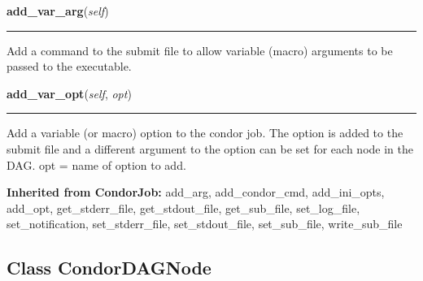    \noindent\begin{boxedminipage}{\textwidth}

    \raggedright \textbf{add\_var\_arg}(\textit{self})

    \vspace{-1.5ex}

    \rule{\textwidth}{0.5\fboxrule}
    Add a command to the submit file to allow variable (macro) arguments 
    to be passed to the executable.

    \vspace{1ex}

    \end{boxedminipage}

    \label{pipeline:CondorDAGJob:add_var_opt}
    \vspace{0.5ex}

    \noindent\begin{boxedminipage}{\textwidth}

    \raggedright \textbf{add\_var\_opt}(\textit{self}, \textit{opt})

    \vspace{-1.5ex}

    \rule{\textwidth}{0.5\fboxrule}
    Add a variable (or macro) option to the condor job. The option is 
    added to the submit file and a different argument to the option can 
    be set for each node in the DAG. opt = name of option to add.

    \vspace{1ex}

    \end{boxedminipage}

  \noindent\textbf{Inherited from CondorJob:}
    add\_arg,
    add\_condor\_cmd,
    add\_ini\_opts,
    add\_opt,
    get\_stderr\_file,
    get\_stdout\_file,
    get\_sub\_file,
    set\_log\_file,
    set\_notification,
    set\_stderr\_file,
    set\_stdout\_file,
    set\_sub\_file,
    write\_sub\_file


\subsection{Class CondorDAGNode}


